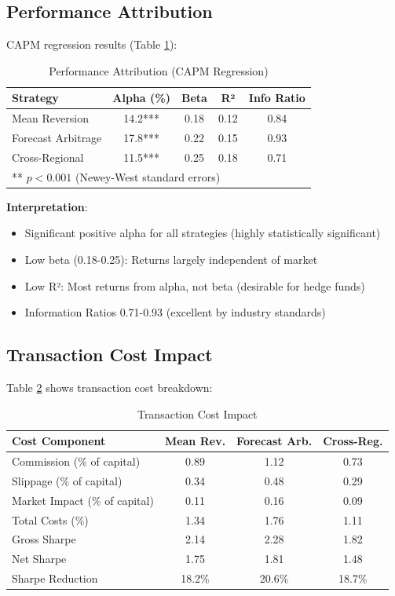 \documentclass[12pt,a4paper]{article}
\begin{document}
\subsection{Performance Attribution}

CAPM regression results (Table \ref{tab:attribution}):

\begin{table}[h]
\centering
\caption{Performance Attribution (CAPM Regression)}
\label{tab:attribution}
\begin{tabular}{lcccc}
\toprule
\textbf{Strategy} & \textbf{Alpha (\%)} & \textbf{Beta} & \textbf{R²} & \textbf{Info Ratio} \\
\midrule
Mean Reversion & 14.2*** & 0.18 & 0.12 & 0.84 \\
Forecast Arbitrage & 17.8*** & 0.22 & 0.15 & 0.93 \\
Cross-Regional & 11.5*** & 0.25 & 0.18 & 0.71 \\
\bottomrule
\multicolumn{5}{l}{\footnotesize *** $p < 0.001$ (Newey-West standard errors)}
\end{tabular}
\end{table}

\textbf{Interpretation}:
\begin{itemize}
    \item Significant positive alpha for all strategies (highly statistically significant)
    \item Low beta (0.18-0.25): Returns largely independent of market
    \item Low R²: Most returns from alpha, not beta (desirable for hedge funds)
    \item Information Ratios 0.71-0.93 (excellent by industry standards)
\end{itemize}

\subsection{Transaction Cost Impact}

Table \ref{tab:costs} shows transaction cost breakdown:

\begin{table}[h]
\centering
\caption{Transaction Cost Impact}
\label{tab:costs}
\begin{tabular}{lccc}
\toprule
\textbf{Cost Component} & \textbf{Mean Rev.} & \textbf{Forecast Arb.} & \textbf{Cross-Reg.} \\
\midrule
Commission (\% of capital) & 0.89 & 1.12 & 0.73 \\
Slippage (\% of capital) & 0.34 & 0.48 & 0.29 \\
Market Impact (\% of capital) & 0.11 & 0.16 & 0.09 \\
\midrule
Total Costs (\%) & 1.34 & 1.76 & 1.11 \\
\midrule
Gross Sharpe & 2.14 & 2.28 & 1.82 \\
Net Sharpe & 1.75 & 1.81 & 1.48 \\
Sharpe Reduction & 18.2\% & 20.6\% & 18.7\% \\
\bottomrule
\end{tabular}
\end{table}
\end{document}
